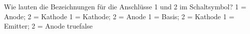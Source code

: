     {Wie lauten die Bezeichnungen für die Anschlüsse 1 und 2 im Schaltsymbol?}
    {1 = Anode; 2 = Kathode}
    {1 = Kathode; 2 = Anode}
    {1 = Basis; 2 = Kathode}
    {1 = Emitter; 2 = Anode}
    {true}{false}